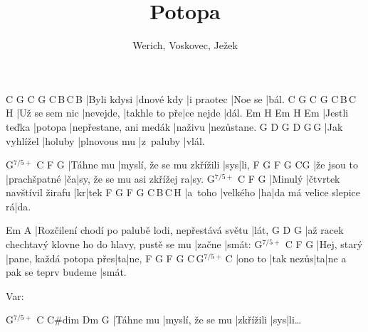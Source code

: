 \documentclass{song}
\title{Potopa}
\author{Werich, Voskovec, Ježek}
\newcommand{\aug}{$^{7/5+}$}
\begin{document}
\strophe
C           G\7        C          G\7     C\,B\7\,C\,B\7
|Byli kdysi |dnové kdy |i praotec |Noe se |bál.
C              G\7       C             G\7       C\,B\7\,C\,H\7
|Už se sem nic |nevejde, |takhle to pře|ce nejde |dál.
Em            H\7     Em                     H\7     Em
|Jestli teďka |potopa |nepřestane, ani medák |naživu |nezůstane.
G             D\7     G            D\7       G\,G\7
|Jak vyhlížel |holuby |plnovous mu |z~paluby |vlál.
\endstrophe

\strophe
{G\aug}     C                         F   G\7
|Táhne mu |myslí, že se mu zkřížili |sys|li,
F			G\7			 F	G\7						C\quad{}G\7
|že jsou to |prachšpatné |ča|sy, že se mu asi zkřížej ra|sy.
{G\aug} C                         F  G\7
|Minulý |čtvrtek navštívil žirafu |kr|tek
F       G\7      F  G\7                     C\,B\7\,C\,H\7
|a~toho |velkého |ha|da má velice slepice rá|da.
\endstrophe

\strophe
Em                                                A\7
|Rozčilení chodí po palubě lodi, nepřestává světu |lát,
G                                                   D\7    G
|až racek chechtavý klovne ho do hlavy, pustě se mu |začne |smát:
{G\aug}       C                       F  G\7
|Hej, starý |pane, každá potopa přes|ta|ne,
F       G\7       F  G\7                       C\,G\aug\,C
|ono to |tak nezůs|ta|ne a pak se teprv budeme |smát.
\endstrophe


Var:

\strophe
{G\aug}   C                C\#dim    Dm\7 G\7
|Táhne mu |myslí, že se mu |zkřížili |sys|li\ldots
\endstrophe
\end{document}
